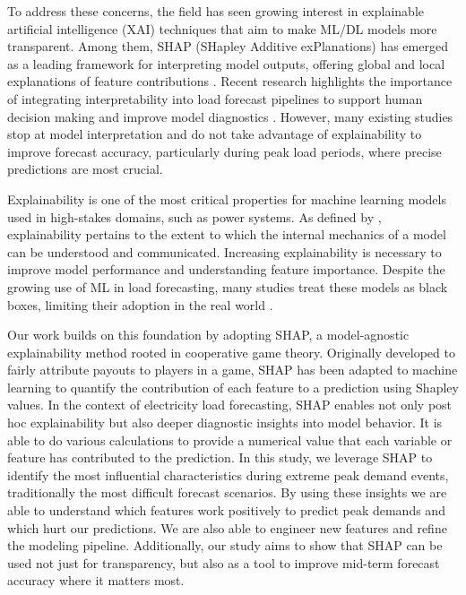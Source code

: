 \documentclass[final,numbered]{ifacconf}
\begin{document}
To address these concerns, the field has seen growing interest in explainable artificial intelligence (XAI) techniques that aim to make ML/DL models more transparent. Among them, SHAP (SHapley Additive exPlanations) has emerged as a leading framework for interpreting model outputs, offering global and local explanations of feature contributions \cite{baur2024explainability, neubauer2025explainableb}. Recent research highlights the importance of integrating interpretability into load forecast pipelines to support human decision making and improve model diagnostics \cite{neubauer2025explainableb, baur2024explainability}. However, many existing studies stop at model interpretation and do not take advantage of explainability to improve forecast accuracy, particularly during peak load periods, where precise predictions are most crucial.

Explainability is one of the most critical properties for machine learning models used in high-stakes domains, such as power systems. As defined by  \cite{baur2024explainability}, explainability pertains to the extent to which the internal mechanics of a model can be understood and communicated. Increasing explainability is necessary to improve model performance and understanding feature importance. Despite the growing use of ML in load forecasting, many studies treat these models as black boxes, limiting their adoption in the real world \cite{baur2024explainability}.

Our work builds on this foundation by adopting SHAP, a model-agnostic explainability method rooted in cooperative game theory. Originally developed to fairly attribute payouts to players in a game, SHAP has been adapted to machine learning to quantify the contribution of each feature to a prediction using Shapley values. In the context of electricity load forecasting, SHAP enables not only post hoc explainability but also deeper diagnostic insights into model behavior. It is able to do various calculations to provide a numerical value that each variable or feature has contributed to the prediction. In this study, we leverage SHAP to identify the most influential characteristics during extreme peak demand events, traditionally the most difficult forecast scenarios. By using these insights we are able to understand which features work positively to predict peak demands and which hurt our predictions. We are also able to engineer new features and refine the modeling pipeline. Additionally, our study aims to show that SHAP can be used not just for transparency, but also as a tool to improve mid-term forecast accuracy where it matters most.
\end{document}

